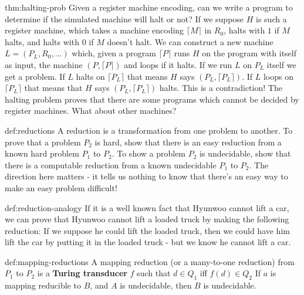 \documentclass[landscape, 8pt]{extarticle}
\begin{document}
\begin{multicols}{3}
\begin{thm}{thm:halting-prob}{}
Given a register machine encoding, can we write a program to determine if the simulated machine will halt or not? \newline
If we suppose $H$ is such a register machine, which takes a machine encoding $\lceil M \rceil$ in $R_{0}$, halts with $1$ if $M$ halts, and halts with $0$ if $M$ doesn't halt. \newline
We can construct a new machine $L = (P_{L}, R_{0},\dots)$ which, given a program $\lceil P \rceil $ runs $H$ on the program with itself as input, the machine $(P, \lceil P \rceil )$ and loops if it halts. \newline
If we run $L$ on $P_{L}$ itself we get a problem. If $L$ halts on $\lceil P_{L} \rceil $ that means $H$ says $(P_{L}, \lceil P_{L} \rceil )$. If $L$ loops on $\lceil P_{L} \rceil $ that means that $H$ says $(P_{L}, \lceil P_{L} \rceil )$ halts.\newline
This is a contradiction! \newline
The halting problem proves that there are some programs which cannot be decided by register machines. What about other machines?
\end{thm}


\begin{dfn}[Reductions]{def:reductions}{}
A reduction is a transformation from one problem to another. To prove that a problem $P_{2}$ is hard, show that there is an easy reduction from a known hard problem $P_{1}$ to $P_{2}$.\newline
To show a problem $P_{2}$ is undecidable, show that there is a computable reduction from a known undecidable $P_{1}$ to $P_{2}$. The direction here matters - it tells us nothing to know that there's an easy way to make an easy problem difficult!
\end{dfn}

\begin{xmp}{def:reduction-analogy}{}
If it is a well known fact that Hyunwoo cannot lift a car, we can prove that
Hyunwoo cannot lift a loaded truck by making the following reduction: If we
suppose he could lift the loaded truck, then we could have him lift the car by
putting it in the loaded truck - but we know he cannot lift a car.
\end{xmp}


\begin{dfn}{def:mapping-reductions}{}
A mapping reduction (or a many-to-one reduction) from $P_{1}$ to $P_{2}$ is a \textbf{Turing transducer} $f$ such that $d\in Q_{1}$ iff $f(d)\in Q_{2}$
\newline
If $a$ is mapping reducible to $B$, and $A$ is undecidable, then $B$ is undecidable.
\end{dfn}


\end{multicols}
\end{document}
